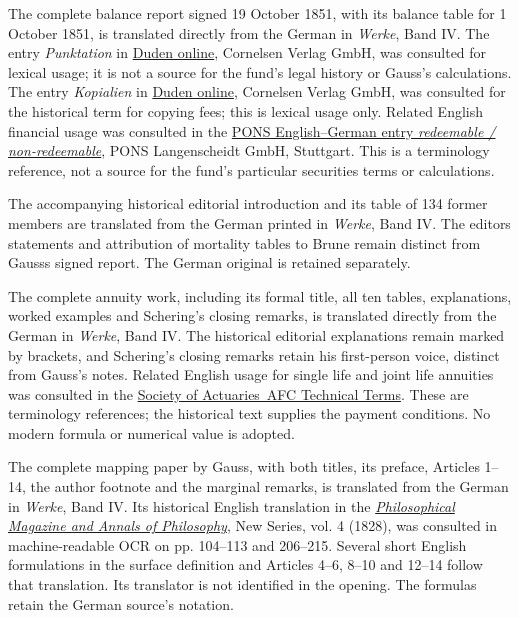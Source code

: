 \par\medskip\noindent The complete balance report signed 19 October 1851, with its balance table for 1 October 1851, is translated directly from the German in \textit{Werke}, Band IV. The entry \textit{Punktation} in \href{https://www.duden.de/rechtschreibung/Punktation}{Duden online}, Cornelsen Verlag GmbH, was consulted for lexical usage; it is not a source for the fund's legal history or Gauss's calculations. The entry \textit{Kopialien} in \href{https://www.duden.de/rechtschreibung/Kopialien}{Duden online}, Cornelsen Verlag GmbH, was consulted for the historical term for copying fees; this is lexical usage only. Related English financial usage was consulted in the \href{https://de.pons.com/\%C3\%BCbersetzung/englisch-deutsch/redeemable}{PONS English--German entry \textit{redeemable / non-redeemable}}, PONS Langenscheidt GmbH, Stuttgart. This is a terminology reference, not a source for the fund's particular securities terms or calculations.
\par\medskip\noindent The accompanying historical editorial introduction and its table of 134 former members are translated from the German printed in \textit{Werke}, Band IV. The editor\textquotesingle s statements and attribution of mortality tables to Brune remain distinct from Gauss\textquotesingle s signed report. The German original is retained separately.
\par\medskip\noindent The complete annuity work, including its formal title, all ten tables, explanations, worked examples and Schering's closing remarks, is translated directly from the German in \textit{Werke}, Band IV. The historical editorial explanations remain marked by brackets, and Schering's closing remarks retain his first-person voice, distinct from Gauss's notes. Related English usage for single life and joint life annuities was consulted in the \href{https://afc.soa.org/}{Society of Actuaries\textquotesingle\ AFC Technical Terms}. These are terminology references; the historical text supplies the payment conditions. No modern formula or numerical value is adopted.
\par\medskip\noindent The complete mapping paper by Gauss, with both titles, its preface, Articles 1--14, the author footnote and the marginal remarks, is translated from the German in \textit{Werke}, Band IV. Its historical English translation in the \href{https://archive.org/details/philosophicalmax04lond}{\textit{Philosophical Magazine and Annals of Philosophy}}, New Series, vol. 4 (1828), was consulted in machine-readable OCR on pp. 104--113 and 206--215. Several short English formulations in the surface definition and Articles 4--6, 8--10 and 12--14 follow that translation. Its translator is not identified in the opening. The formulas retain the German source's notation.
